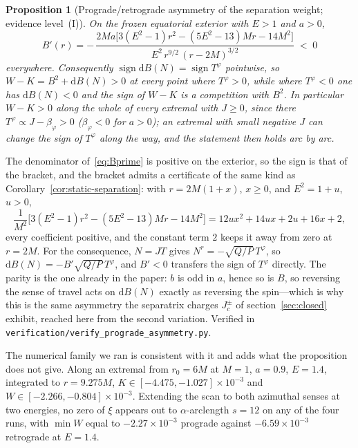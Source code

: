 \documentclass[12pt]{iopart}
\theoremstyle{plain}
\newtheorem{proposition}{Proposition}
\theoremstyle{definition}
\theoremstyle{remark}
\newcommand{\Jc}{J_{c}}
\newcommand{\dd}{\mathrm{d}}
\begin{document}
\begin{proposition}[Prograde/retrograde asymmetry of the separation weight;
evidence level~(I)]
\label{prop:prograde-asym}
On the frozen equatorial exterior with $E>1$ and $a>0$,
\begin{equation}
    B'(r)=-\,\frac{2Ma\big[3(E^2-1)r^2-(5E^2-13)Mr-14M^2\big]}
                  {E^2\,r^{9/2}\,(r-2M)^{3/2}}\;<\;0
    \label{eq:Bprime}
\end{equation}
everywhere. Consequently $\operatorname{sign}\dd B(N)=\operatorname{sign}T^\varphi$
pointwise, so $W-K=B^2+\dd B(N)>0$ at every point where $T^\varphi>0$, while where
$T^\varphi<0$ one has $\dd B(N)<0$ and the sign of $W-K$ is a competition with $B^2$.
In particular $W-K>0$ along the whole of every extremal with $J\ge0$, since there
$T^\varphi\propto J-\beta_\varphi>0$ ($\beta_\varphi<0$ for $a>0$); an extremal with
small negative $J$ can change the sign of $T^\varphi$ along the way, and the statement
then holds arc by arc.
\end{proposition}

The denominator of~\eqref{eq:Bprime} is positive on the exterior, so the sign is
that of the bracket, and the bracket admits a certificate of the same kind as
Corollary~\ref{cor:static-separation}: with $r=2M(1+x)$, $x\ge0$, and
$E^2=1+u$, $u>0$,
\[
    \frac{1}{M^2}\big[3(E^2-1)r^2-(5E^2-13)Mr-14M^2\big]
      =12ux^2+14ux+2u+16x+2 ,
\]
every coefficient positive, and the constant term $2$ keeps it away from zero at
$r=2M$. For the consequence, $N=JT$ gives $N^r=-\sqrt{Q/P}\,T^\varphi$, so
$\dd B(N)=-B'\sqrt{Q/P}\,T^\varphi$, and $B'<0$ transfers the sign of $T^\varphi$
directly. The parity is the one already in the paper: $b$ is odd in $a$, hence so
is $B$, so reversing the sense of travel acts on $\dd B(N)$ exactly as reversing
the spin---which is why this is the same asymmetry the separatrix charges
$\Jc^{\pm}$ of section~\ref{sec:closed} exhibit, reached here from the second
variation. Verified in
\texttt{verification/verify\_prograde\_asymmetry.py}.

The numerical family we ran is consistent with it and adds what the proposition
does not give. Along an extremal from
$r_0=6M$ at $M=1$, $a=0.9$, $E=1.4$, integrated to $r=9.275M$,
$K\in[-4.475,-1.027]\times10^{-3}$ and $W\in[-2.266,-0.804]\times10^{-3}$.
Extending the scan to both azimuthal senses at two energies, no zero of $\xi$
appears out to $\alpha$-arclength $s=12$ on any of the four runs, with $\min W$
equal to $-2.27\times10^{-3}$ prograde against $-6.59\times10^{-3}$ retrograde at
$E=1.4$.
\end{document}
